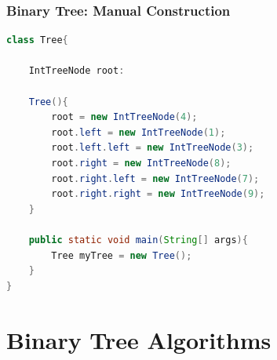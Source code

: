 \documentclass{beamer}
\begin{document}
\begin{frame}[fragile]
    \frametitle{Binary Tree: Manual Construction }
    \begin{minipage}{0.69\textwidth}
        \begin{lstlisting}[language=Java, autogobble, basicstyle=\scriptsize]
class Tree{

    IntTreeNode root:

    Tree(){
        root = new IntTreeNode(4);
        root.left = new IntTreeNode(1);
        root.left.left = new IntTreeNode(3);
        root.right = new IntTreeNode(8);
        root.right.left = new IntTreeNode(7);
        root.right.right = new IntTreeNode(9);
    }

    public static void main(String[] args){
        Tree myTree = new Tree();
    }
}
        \end{lstlisting}
    \end{minipage}
    \hfill
    \begin{minipage}{0.29\textwidth}
    \end{minipage}
\end{frame}


\section{Binary Tree Algorithms}
\end{document}
